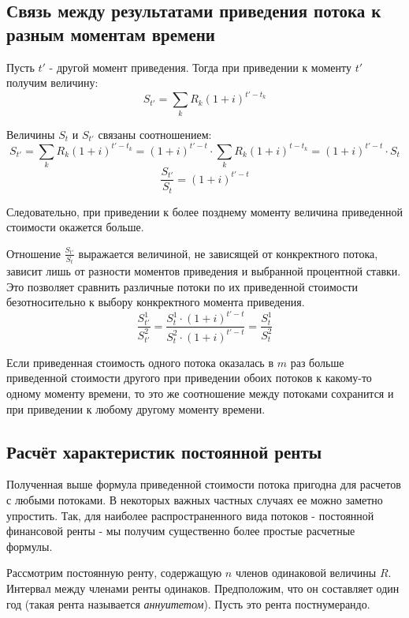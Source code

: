 \documentclass[aps,%
12pt,%
final,%
oneside,
onecolumn,%
musixtex, %
superscriptaddress,%
centertags]{article} %
\theoremstyle{plain}
\theoremstyle{definition}
\theoremstyle{remark}
\begin{document}

\subsection{Связь между результатами приведения потока к разным моментам времени}

Пусть $t'$ - другой момент приведения. Тогда при приведении к моменту $t'$ получим величину:
$$S_{t'} = \sum_{k} R_k (1+i)^{t'-t_k}$$

Величины $S_t$ и $S_{t'}$ связаны соотношением:
$$S_{t'} = \sum_{k} R_k (1+i)^{t'-t_k} = (1+i)^{t'-t} \cdot \sum_{k} R_k (1+i)^{t-t_k} = (1+i)^{t'-t} \cdot S_t $$
$$\frac{S_{t'}}{S_t} = (1+i)^{t'-t}$$

Следовательно, при приведении к более позднему моменту величина приведенной стоимости окажется больше.

Отношение $\frac{S_{t'}}{S_t}$ выражается величиной, не зависящей от конкректного потока, зависит лишь от разности моментов приведения и выбранной процентной ставки. Это позволяет сравнить различные потоки по их приведенной стоимости безотносительно к выбору конкректного момента приведения.
$$\frac{S_{t'}^1}{S_{t'}^2} = \frac{S_{t}^1 \cdot (1+i)^{t'-t}}{S_{t}^2 \cdot (1+i)^{t'-t}} = \frac{S_{t}^1} {S_{t}^2}$$

Если приведенная стоимость одного потока оказалась в $m$ раз больше приведенной стоимости другого при приведении обоих потоков к какому-то одному моменту времени, то это же соотношение между потоками сохранится и при приведении к любому другому моменту времени.


\subsection{Расчёт характеристик постоянной ренты }

Полученная выше формула приведенной стоимости потока пригодна для расчетов с любыми потоками. В некоторых важных частных случаях ее можно заметно упростить. Так, для наиболее распространенного вида потоков - постоянной финансовой ренты - мы получим существенно более простые расчетные формулы. 

Рассмотрим постоянную ренту, содержащую $n$ членов одинаковой величины $R$. Интервал между членами ренты одинаков. Предположим, что он составляет один год (такая рента называется \textit{аннуитетом}). Пусть это рента постнумерандо.
\end{document}
